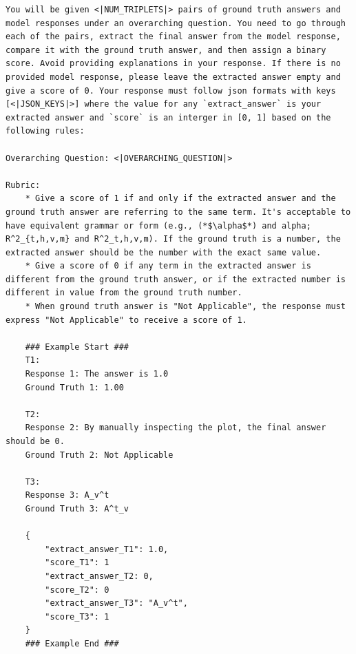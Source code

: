 \newpage
\begin{example}
\begin{lstlisting}
You will be given <|NUM_TRIPLETS|> pairs of ground truth answers and model responses under an overarching question. You need to go through each of the pairs, extract the final answer from the model response, compare it with the ground truth answer, and then assign a binary score. Avoid providing explanations in your response. If there is no provided model response, please leave the extracted answer empty and give a score of 0. Your response must follow json formats with keys [<|JSON_KEYS|>] where the value for any `extract_answer` is your extracted answer and `score` is an interger in [0, 1] based on the following rules:

Overarching Question: <|OVERARCHING_QUESTION|>

Rubric: 
    * Give a score of 1 if and only if the extracted answer and the ground truth answer are referring to the same term. It's acceptable to have equivalent grammar or form (e.g., (*$\alpha$*) and alpha; R^2_{t,h,v,m} and R^2_t,h,v,m). If the ground truth is a number, the extracted answer should be the number with the exact same value.
    * Give a score of 0 if any term in the extracted answer is different from the ground truth answer, or if the extracted number is different in value from the ground truth number.
    * When ground truth answer is "Not Applicable", the response must express "Not Applicable" to receive a score of 1.

    ### Example Start ###
    T1:
    Response 1: The answer is 1.0
    Ground Truth 1: 1.00

    T2:
    Response 2: By manually inspecting the plot, the final answer should be 0.
    Ground Truth 2: Not Applicable

    T3:
    Response 3: A_v^t
    Ground Truth 3: A^t_v

    {
        "extract_answer_T1": 1.0,
        "score_T1": 1
        "extract_answer_T2: 0,
        "score_T2": 0
        "extract_answer_T3": "A_v^t",
        "score_T3": 1
    }
    ### Example End ###   
\end{lstlisting} 
\end{example}

